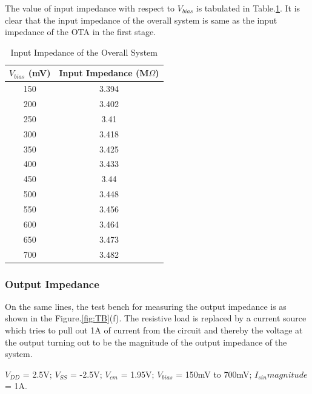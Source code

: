 The value of input impedance with respect to $V_{bias}$ is tabulated in Table.\ref{tab:ZIN}. It is clear that the input impedance of the overall system is same as the input impedance of the OTA in the first stage.
\begin{table} [H]
\centering
\begin{tabular}{@{}cc@{}}
\toprule
$V_{bias}$ (mV)			& Input Impedance (M$\Omega$)	\\ \midrule
150					& 3.394  \\
200					& 3.402  \\
250					& 3.41   \\
300					& 3.418	 \\
350					& 3.425	 \\
400					& 3.433	 \\
450					& 3.44  \\
500					& 3.448 \\
550					& 3.456 \\
600					& 3.464 \\
650					& 3.473 \\
700 				& 3.482 \\
\bottomrule
\end{tabular}
\caption{Input Impedance of the Overall System}
\label{tab:ZIN}
\end{table}

\subsubsection{Output Impedance}
On the same lines, the test bench for measuring the output impedance is as shown in the Figure.\ref{fig:TB}(f). The resistive load is replaced by a current source which tries to pull out 1A of current from the circuit and thereby the voltage at the output turning out to be the magnitude of the output impedance of the system.

$V_{DD}$ = 2.5V; $V_{SS}$ = -2.5V; $V_{cm}$ = 1.95V; $V_{bias}$ = 150mV to 700mV;  $I_{sin} magnitude$ = 1A.

